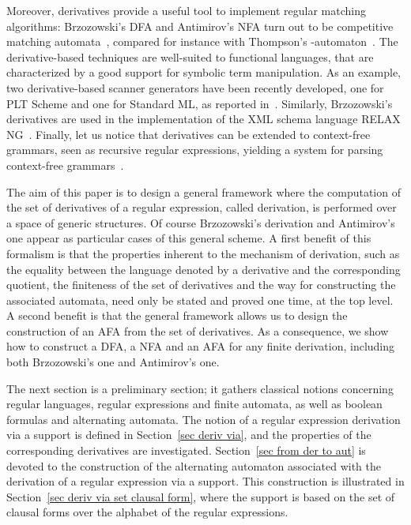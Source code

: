 \documentclass{article}
\begin{document}
Moreover, derivatives provide a useful tool to implement regular matching algorithms:
Brzozowski's DFA and Antimirov's NFA turn out to be 
competitive matching automata~\cite{SL07},
compared for instance with Thompson's -automaton~\cite{Tho68}.
The derivative-based techniques are well-suited to functional languages,
that are characterized by a good support for symbolic term manipulation.
As an example, two derivative-based scanner generators have been recently developed,
one for PLT Scheme and one for Standard ML, as reported in~\cite{ORT09}.
Similarly, Brzozowski's derivatives are used in the implementation of the XML schema language RELAX NG~\cite{Cla02}.
Finally, let us notice that derivatives can be extended to context-free grammars, seen as recursive regular expressions,
yielding a system for parsing context-free grammars~\cite{MDS11}.


The aim of this paper is to design a general 
framework
where the computation of the set of derivatives of a regular expression, called derivation, is performed over a space of generic structures.
Of course Brzozowski's derivation and Antimirov's one appear as particular cases of this general scheme.
A first benefit of this formalism is that the properties inherent to the mechanism of derivation, such as 
the equality between the language denoted by a derivative and the corresponding quotient,
the finiteness of the set of derivatives
and the way for constructing the associated automata,
need only be stated and proved one time, at the top level. 
A second benefit is that the general 
framework
allows us to design the construction of an AFA from the set of derivatives.
As a consequence, we show how to construct a DFA, a NFA and an AFA for any finite derivation, including both Brzozowski's one and Antimirov's one.

The next section is a preliminary section; it gathers classical notions concerning 
regular languages, regular expressions and finite automata, as well as boolean formulas and alternating automata.
The notion of a regular expression derivation via a support is defined in Section~\ref{sec deriv via},
and the properties of the corresponding derivatives are investigated. 
Section~\ref{sec from der to aut} is devoted to the construction of the alternating automaton
associated with the derivation of a regular expression via a support.
This construction is illustrated in Section~\ref{sec deriv via set clausal form},
where the support is based on the set of clausal forms over the alphabet of the regular expressions.
\end{document}
